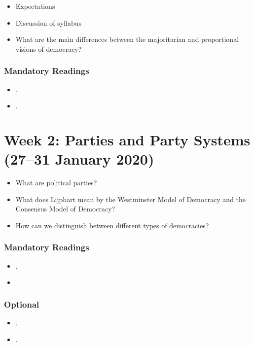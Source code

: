 \documentclass[abstract=on,parskip=full,headings=standardclasses,fontsize=11pt,paper=a4]{scrartcl}
\begin{document}
\begin{itemize}
\renewcommand\labelitemi{--}
\item Expectations
\item Discussion of syllabus
\item What are the main differences between the majoritarian and proportional visions of democracy?
\end{itemize}


\subsubsection*{Mandatory Readings}
\begin{itemize}
\item {}.
\item {}.
\end{itemize}


\section{Week 2: Parties and Party Systems (27--31 January 2020)}

\begin{itemize}
\renewcommand\labelitemi{--}
\item  What are political parties?
\item What does Lijphart mean by the Westminster Model of Democracy and the Consensus Model of Democracy?
\item How can we distinguish between different types of democracies?
\end{itemize}

\subsubsection*{Mandatory Readings}
\begin{itemize}
\item {}.
\item {}
\end{itemize}



\subsubsection*{Optional}
\begin{itemize}
\item {}.
\item {}.
\end{itemize}
\end{document}
